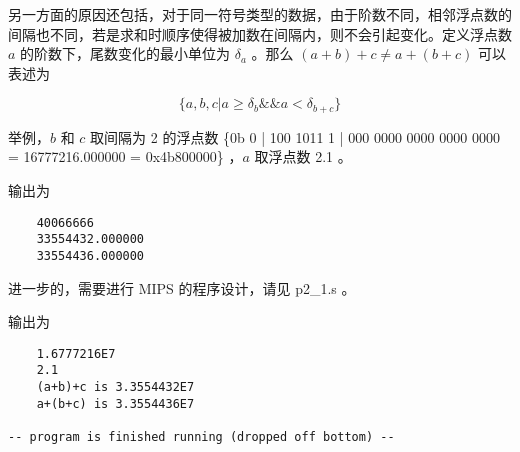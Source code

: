 \documentclass[lang=cn,11pt,a4paper,cite=authoryear]{elegantpaper}
\begin{document}
另一方面的原因还包括，对于同一符号类型的数据，由于阶数不同，相邻浮点数的间隔也不同，若是求和时顺序使得被加数在间隔内，则不会引起变化。定义浮点数 \(a\) 的阶数下，尾数变化的最小单位为 \(\delta_a\) 。那么 \((a+b)+c \neq a+(b+c)\) 可以表述为

\[\{a, b, c| a \geq \delta_b \&\& a < \delta_{b+c}\}\]

举例，\(b\) 和 \(c\) 取间隔为 2 的浮点数 \{0b 0 | 100 1011 1 | 000 0000 0000 0000 0000 = 16777216.000000 = 0x4b800000\} ，\(a\)  取浮点数 2.1 。



输出为 

\begin{lstlisting}
    40066666
    33554432.000000
    33554436.000000
\end{lstlisting}

进一步的，需要进行 MIPS 的程序设计，请见 p2\_1.s 。




输出为 

\begin{lstlisting}
    1.6777216E7
    2.1
    (a+b)+c is 3.3554432E7
    a+(b+c) is 3.3554436E7

-- program is finished running (dropped off bottom) --
\end{lstlisting}


\end{document}
